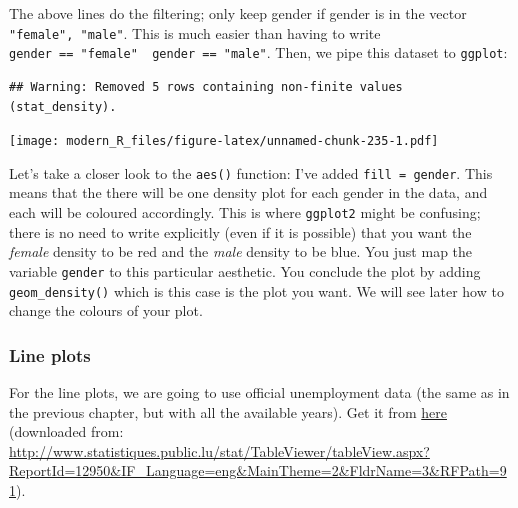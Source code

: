 \documentclass[]{gitbook}
\newenvironment{Shaded}{\begin{snugshade}}{\end{snugshade}}
\newcommand{\DataTypeTok}[1]{\textcolor[rgb]{0.13,0.29,0.53}{#1}}
\newcommand{\KeywordTok}[1]{\textcolor[rgb]{0.13,0.29,0.53}{\textbf{#1}}}
\newcommand{\NormalTok}[1]{#1}
\newcommand{\OperatorTok}[1]{\textcolor[rgb]{0.81,0.36,0.00}{\textbf{#1}}}
\newcommand{\StringTok}[1]{\textcolor[rgb]{0.31,0.60,0.02}{#1}}
\theoremstyle{definition}
\theoremstyle{definition}
\theoremstyle{definition}
\theoremstyle{remark}
\begin{document}
The above lines do the filtering; only keep gender if gender is in the
vector \texttt{"female",\ "male"}. This is much easier than having to
write \texttt{gender\ ==\ "female"\ \textbar{}\ gender\ ==\ "male"}.
Then, we pipe this dataset to \texttt{ggplot}:

\begin{Shaded}
\end{Shaded}

\begin{verbatim}
## Warning: Removed 5 rows containing non-finite values (stat_density).
\end{verbatim}

\texttt{[image: modern\_R\_files/figure-latex/unnamed-chunk-235-1.pdf]}

Let's take a closer look to the \texttt{aes()} function: I've added
\texttt{fill\ =\ gender}. This means that the there will be one density
plot for each gender in the data, and each will be coloured accordingly.
This is where \texttt{ggplot2} might be confusing; there is no need to
write explicitly (even if it is possible) that you want the
\emph{female} density to be red and the \emph{male} density to be blue.
You just map the variable \texttt{gender} to this particular aesthetic.
You conclude the plot by adding \texttt{geom\_density()} which is this
case is the plot you want. We will see later how to change the colours
of your plot.

\hypertarget{line-plots}{%
\subsubsection{Line plots}\label{line-plots}}

For the line plots, we are going to use official unemployment data (the
same as in the previous chapter, but with all the available years). Get
it from
\href{https://github.com/b-rodrigues/modern_R/tree/master/datasets/unemployment/all}{here}
(downloaded from:
\url{http://www.statistiques.public.lu/stat/TableViewer/tableView.aspx?ReportId=12950\&IF_Language=eng\&MainTheme=2\&FldrName=3\&RFPath=91}).
\end{document}
